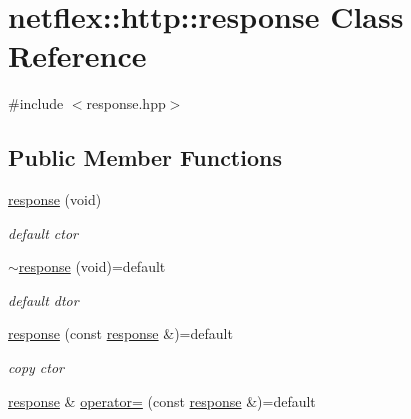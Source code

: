 \hypertarget{classnetflex_1_1http_1_1response}{}\section{netflex\+:\+:http\+:\+:response Class Reference}
\label{classnetflex_1_1http_1_1response}


{\ttfamily \#include $<$response.\+hpp$>$}

\subsection*{Public Member Functions}
\begin{DoxyCompactItemize}
\item 
\mbox{\label{classnetflex_1_1http_1_1response_a73aab521e1e08f804a58fd79b562f0bc}} 
\hyperlink{classnetflex_1_1http_1_1response_a73aab521e1e08f804a58fd79b562f0bc}{response} (void)
\begin{DoxyCompactList}\small\item\em default ctor \end{DoxyCompactList}\item 
\mbox{\label{classnetflex_1_1http_1_1response_a27993dd9909d70007f01d5cab50490b4}} 
\hyperlink{classnetflex_1_1http_1_1response_a27993dd9909d70007f01d5cab50490b4}{$\sim$response} (void)=default
\begin{DoxyCompactList}\small\item\em default dtor \end{DoxyCompactList}\item 
\mbox{\label{classnetflex_1_1http_1_1response_a3b45f99380312143e915f6e820ec8cec}} 
\hyperlink{classnetflex_1_1http_1_1response_a3b45f99380312143e915f6e820ec8cec}{response} (const \hyperlink{classnetflex_1_1http_1_1response}{response} \&)=default
\begin{DoxyCompactList}\small\item\em copy ctor \end{DoxyCompactList}\item 
\mbox{\label{classnetflex_1_1http_1_1response_a9ebb5c421d490002b7a441d3be9b9c09}} 
\hyperlink{classnetflex_1_1http_1_1response}{response} \& \hyperlink{classnetflex_1_1http_1_1response_a9ebb5c421d490002b7a441d3be9b9c09}{operator=} (const \hyperlink{classnetflex_1_1http_1_1response}{response} \&)=default

\end{DoxyCompactItemize}

